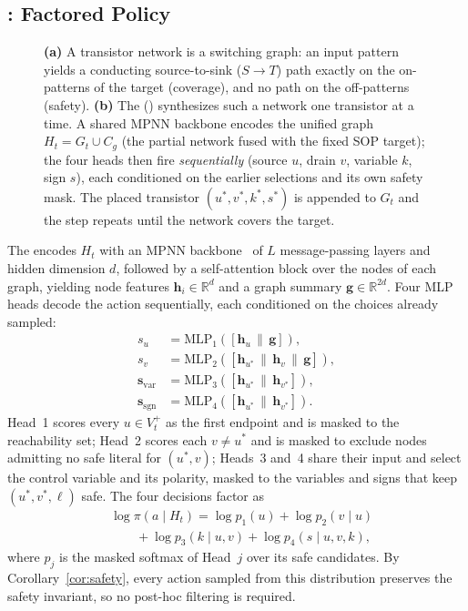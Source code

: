 \subsection{\sgpn: Factored Policy}
\label{sec:sgpn}

\begin{figure}[t]
\centering

\caption{\textbf{(a)} A transistor network is a switching graph: an input
pattern yields a conducting source-to-sink ($S{\to}T$) path exactly on the
on-patterns of the target (coverage), and no path on the off-patterns
(safety). \textbf{(b)} The \sgpn (\SGPN) synthesizes such a network one
transistor at a time. A shared MPNN backbone encodes the unified graph
$H_t = G_t \cup C_g$ (the partial network fused with the fixed SOP target);
the four heads then fire \emph{sequentially} (source $u$, drain $v$, variable
$k$, sign $s$), each conditioned on the earlier selections and its own safety
mask. The placed transistor $(u^*,v^*,k^*,s^*)$ is appended to $G_t$ and the
step repeats until the network covers the target.}
\label{fig:sgpn}
\end{figure}

The \SGPN encodes $H_t$ with an MPNN backbone~\cite{gilmer2017mpnn}
of $L$ message-passing layers and hidden dimension $d$, followed by a
self-attention block over the nodes of each graph, yielding node features
$\mathbf{h}_i \in \mathbb{R}^d$ and a graph summary
$\mathbf{g} \in \mathbb{R}^{2d}$.
Four MLP heads decode the action sequentially, each conditioned on the
choices already sampled:
\begin{align*}
  s_u                       &= \mathrm{MLP}_1([\mathbf{h}_u \,\|\, \mathbf{g}]), \\
  s_v                       &= \mathrm{MLP}_2([\mathbf{h}_{u^*} \,\|\, \mathbf{h}_v \,\|\, \mathbf{g}]), \\
  \mathbf{s}_{\mathrm{var}} &= \mathrm{MLP}_3([\mathbf{h}_{u^*} \,\|\, \mathbf{h}_{v^*}]), \\
  \mathbf{s}_{\mathrm{sgn}} &= \mathrm{MLP}_4([\mathbf{h}_{u^*} \,\|\, \mathbf{h}_{v^*}]).
\end{align*}
Head~1 scores every $u \in V_t^+$ as the first endpoint and is masked to the
reachability set; Head~2 scores each $v \neq u^*$ and is masked to exclude
nodes admitting no safe literal for $(u^*, v)$; Heads~3 and~4 share their
input and select the control variable and its polarity, masked to the
variables and signs that keep $(u^*, v^*, \ell)$ safe.
The four decisions factor as
\begin{equation}
\begin{aligned}
  &\log \pi(a \mid H_t) = \log p_1(u) + \log p_2(v \mid u) \\
  &\qquad + \log p_3(k \mid u,v) + \log p_4(s \mid u,v,k),
\end{aligned}
\label{eq:logp}
\end{equation}
where $p_j$ is the masked softmax of Head~$j$ over its safe candidates.
By Corollary~\ref{cor:safety}, every action sampled from this distribution
preserves the safety invariant, so no post-hoc filtering is required.


